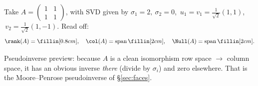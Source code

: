 
\begin{yourturn}
Take $\displaystyle A=\begin{pmatrix}1&1\\1&1\end{pmatrix}$, with SVD given by $\sigma_1=2,\ \sigma_2=0$,
$\,u_1=v_1=\tfrac1{\sqrt2}(1,1)$, $\,v_2=\tfrac1{\sqrt2}(1,-1)$. Read off:
\[
  \rank(A)=\fillin[0.8cm],\quad \col(A)=\operatorname{span}\fillin[2cm],\quad
  \Null(A)=\operatorname{span}\fillin[2cm].
\]
\end{yourturn}

\begin{strand}
Pseudoinverse preview: because $A$ is a clean isomorphism row space $\to$ column space, it has an
obvious inverse \emph{there} (divide by $\sigma_i$) and zero elsewhere. That is the Moore--Penrose
pseudoinverse of §\ref{sec:faces}.
\end{strand}
